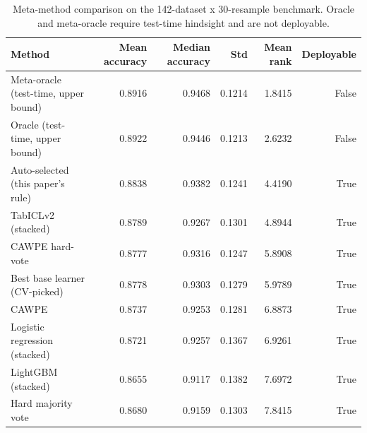 \begin{table}[t]
\centering
\begin{tabular}{lrrrrr}
\toprule
Method & Mean accuracy & Median accuracy & Std & Mean rank & Deployable \\
\midrule
Meta-oracle (test-time, upper bound) & 0.8916 & 0.9468 & 0.1214 & 1.8415 & False \\
Oracle (test-time, upper bound) & 0.8922 & 0.9446 & 0.1213 & 2.6232 & False \\
Auto-selected (this paper's rule) & 0.8838 & 0.9382 & 0.1241 & 4.4190 & True \\
TabICLv2 (stacked) & 0.8789 & 0.9267 & 0.1301 & 4.8944 & True \\
CAWPE hard-vote & 0.8777 & 0.9316 & 0.1247 & 5.8908 & True \\
Best base learner (CV-picked) & 0.8778 & 0.9303 & 0.1279 & 5.9789 & True \\
CAWPE & 0.8737 & 0.9253 & 0.1281 & 6.8873 & True \\
Logistic regression (stacked) & 0.8721 & 0.9257 & 0.1367 & 6.9261 & True \\
LightGBM (stacked) & 0.8655 & 0.9117 & 0.1382 & 7.6972 & True \\
Hard majority vote & 0.8680 & 0.9159 & 0.1303 & 7.8415 & True \\
\bottomrule
\end{tabular}
\caption{Meta-method comparison on the 142-dataset x 30-resample benchmark. Oracle and meta-oracle require test-time hindsight and are not deployable.}
\label{tab:meta_method_comparison}
\end{table}
